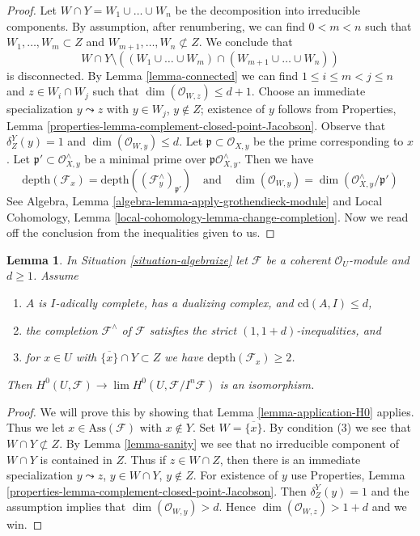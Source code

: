 \documentclass{stacks-project}
\theoremstyle{plain}
\newtheorem{lemma}[subsection]{Lemma}
\theoremstyle{definition}
\theoremstyle{remark}
\numberwithin{equation}{subsection}
\def\lim{\mathop{\mathrm{lim}}\nolimits}
\begin{document}
\begin{proof}
Let $W \cap Y = W_1 \cup \ldots \cup W_n$ be the decomposition into
irreducible components. By assumption, after renumbering, we can find
$0 < m < n$ such that $W_1, \ldots, W_m  \subset Z$ and
$W_{m + 1}, \ldots, W_n \not \subset Z$. We conclude that
$$
W \cap Y \setminus
\left((W_1 \cup \ldots \cup W_m) \cap (W_{m + 1} \cup \ldots \cup W_n)\right)
$$
is disconnected. By Lemma \ref{lemma-connected} we can find
$1 \leq i \leq m < j \leq n$ and
$z \in W_i \cap W_j$ such that $\dim(\mathcal{O}_{W, z}) \leq d + 1$.
Choose an immediate specialization $y \leadsto z$ with
$y \in W_j$, $y \not \in Z$; existence of $y$ follows from
Properties, Lemma \ref{properties-lemma-complement-closed-point-Jacobson}.
Observe that $\delta^Y_Z(y) = 1$ and $\dim(\mathcal{O}_{W, y}) \leq d$.
Let $\mathfrak p \subset \mathcal{O}_{X, y}$ be the prime corresponding to $x$.
Let $\mathfrak p' \subset \mathcal{O}_{X, y}^\wedge$ be a minimal prime
over $\mathfrak p\mathcal{O}_{X, y}^\wedge$. Then we have
$$
\text{depth}(\mathcal{F}_x) =
\text{depth}((\mathcal{F}^\wedge_y)_{\mathfrak p'})
\quad\text{and}\quad
\dim(\mathcal{O}_{W, y}) = \dim(\mathcal{O}_{X, y}^\wedge/\mathfrak p')
$$
See Algebra, Lemma \ref{algebra-lemma-apply-grothendieck-module} and
Local Cohomology, Lemma \ref{local-cohomology-lemma-change-completion}.
Now we read off the conclusion from the inequalities given to us.
\end{proof}

\begin{lemma}
\label{lemma-recover}
In Situation \ref{situation-algebraize} let $\mathcal{F}$ be a
coherent $\mathcal{O}_U$-module and $d \geq 1$. Assume
\begin{enumerate}
\item $A$ is $I$-adically complete, has a dualizing complex, and
$\text{cd}(A, I) \leq d$,
\item the completion $\mathcal{F}^\wedge$ of $\mathcal{F}$
satisfies the strict $(1, 1+ d)$-inequalities, and
\item for $x \in U$ with $\overline{\{x\}} \cap Y \subset Z$
we have $\text{depth}(\mathcal{F}_x) \geq 2$.
\end{enumerate}
Then $H^0(U, \mathcal{F}) \to \lim H^0(U, \mathcal{F}/I^n\mathcal{F})$
is an isomorphism.
\end{lemma}

\begin{proof}
We will prove this by showing that Lemma \ref{lemma-application-H0} applies.
Thus we let $x \in \text{Ass}(\mathcal{F})$ with $x \not \in Y$.
Set $W = \overline{\{x\}}$.
By condition (3) we see that $W \cap Y \not \subset Z$.
By Lemma \ref{lemma-sanity} we see that no irreducible
component of $W \cap Y$ is contained in $Z$.
Thus if $z \in W \cap Z$, then there is an immediate
specialization $y \leadsto z$, $y \in W \cap Y$, $y \not \in Z$.
For existence of $y$ use
Properties, Lemma \ref{properties-lemma-complement-closed-point-Jacobson}.
Then $\delta^Y_Z(y) = 1$ and the assumption
implies that $\dim(\mathcal{O}_{W, y}) > d$.
Hence $\dim(\mathcal{O}_{W, z}) > 1 + d$ and we win.
\end{proof}
\end{document}
